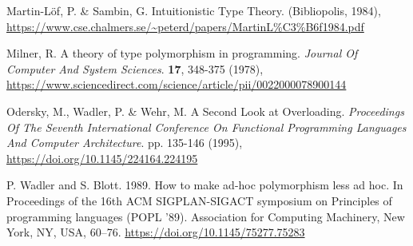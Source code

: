  Martin-Löf, P. \& Sambin, G. Intuitionistic Type Theory. (Bibliopolis, 1984), \url{https://www.cse.chalmers.se/~peterd/papers/MartinL%C3%B6f1984.pdf}

 Milner, R. A theory of type polymorphism in programming. 
{\em Journal Of Computer And System Sciences}. 
\textbf{17}, 348-375 (1978), \url{https://www.sciencedirect.com/science/article/pii/0022000078900144}

 Odersky, M., Wadler, P. \& Wehr, M. A Second Look at Overloading. 
{\em Proceedings Of The Seventh International Conference On Functional Programming Languages And Computer Architecture}. 
pp. 135-146 (1995), \url{https://doi.org/10.1145/224164.224195}

 P. Wadler and S. Blott. 1989. How to make ad-hoc polymorphism less ad hoc. In Proceedings of the 16th ACM SIGPLAN-SIGACT symposium on Principles of programming languages (POPL '89). Association for Computing Machinery, New York, NY, USA, 60–76. \url{https://doi.org/10.1145/75277.75283}
